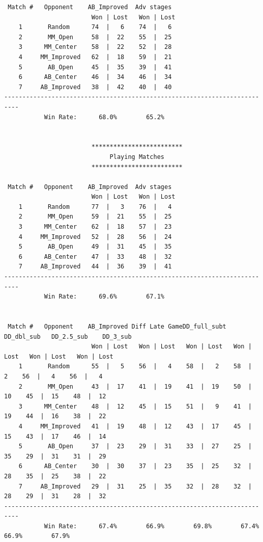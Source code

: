 \documentclass[a4paper,12pt]{article}
\begin{document}
\begin{verbatim}
 Match #   Opponent    AB_Improved  Adv stages  
                        Won | Lost   Won | Lost 
    1       Random      74  |   6    74  |   6  
    2       MM_Open     58  |  22    55  |  25  
    3      MM_Center    58  |  22    52  |  28  
    4     MM_Improved   62  |  18    59  |  21  
    5       AB_Open     45  |  35    39  |  41  
    6      AB_Center    46  |  34    46  |  34  
    7     AB_Improved   38  |  42    40  |  40  
--------------------------------------------------------------------------
           Win Rate:      68.0%        65.2%    


                        *************************                         
                             Playing Matches                              
                        *************************                         

 Match #   Opponent    AB_Improved  Adv stages  
                        Won | Lost   Won | Lost 
    1       Random      77  |   3    76  |   4  
    2       MM_Open     59  |  21    55  |  25  
    3      MM_Center    62  |  18    57  |  23  
    4     MM_Improved   52  |  28    56  |  24  
    5       AB_Open     49  |  31    45  |  35  
    6      AB_Center    47  |  33    48  |  32  
    7     AB_Improved   44  |  36    39  |  41  
--------------------------------------------------------------------------
           Win Rate:      69.6%        67.1%    


 Match #   Opponent    AB_Improved Diff Late GameDD_full_subt  DD_dbl_sub   DD_2.5_sub    DD_3_sub   
                        Won | Lost   Won | Lost   Won | Lost   Won | Lost   Won | Lost   Won | Lost 
    1       Random      55  |   5    56  |   4    58  |   2    58  |   2    56  |   4    56  |   4  
    2       MM_Open     43  |  17    41  |  19    41  |  19    50  |  10    45  |  15    48  |  12  
    3      MM_Center    48  |  12    45  |  15    51  |   9    41  |  19    44  |  16    38  |  22  
    4     MM_Improved   41  |  19    48  |  12    43  |  17    45  |  15    43  |  17    46  |  14  
    5       AB_Open     37  |  23    29  |  31    33  |  27    25  |  35    29  |  31    31  |  29  
    6      AB_Center    30  |  30    37  |  23    35  |  25    32  |  28    35  |  25    38  |  22  
    7     AB_Improved   29  |  31    25  |  35    32  |  28    32  |  28    29  |  31    28  |  32  
--------------------------------------------------------------------------
           Win Rate:      67.4%        66.9%        69.8%        67.4%        66.9%        67.9%    


\end{verbatim}
\end{document}
